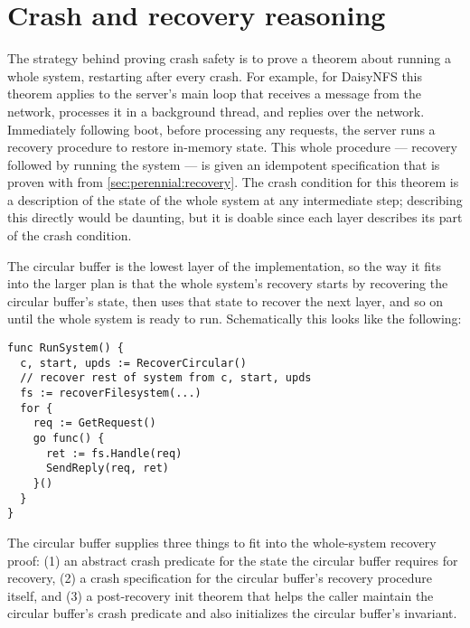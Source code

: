 \section{Crash and recovery reasoning}%
\label{sec:perennial:recovery-spec}

The strategy behind proving crash safety is to prove a theorem about running a
whole system, restarting after every crash. For example, for DaisyNFS this
theorem applies to the server's main loop that receives a message from the
network, processes it in a background thread, and replies over the network.
Immediately following boot, before processing any requests, the server runs a
recovery procedure to restore in-memory state. This whole procedure --- recovery
followed by running the system --- is given an idempotent specification that is
proven with  from \cref{sec:perennial:recovery}. The
crash condition for this theorem is a description of the state of the whole
system at any intermediate step; describing this directly would be daunting, but
it is doable since each layer describes its part of the crash condition.

The circular buffer is the lowest layer of the implementation, so the way it
fits into the larger plan is that the whole system's recovery starts by
recovering the circular buffer's state, then uses that state to recover the next
layer, and so on until the whole system is ready to run. Schematically this
looks like the following:
%
\begin{verbatim}
func RunSystem() {
  c, start, upds := RecoverCircular()
  // recover rest of system from c, start, upds
  fs := recoverFilesystem(...)
  for {
    req := GetRequest()
    go func() {
      ret := fs.Handle(req)
      SendReply(req, ret)
    }()
  }
}
\end{verbatim}

The circular buffer supplies three things to fit into the whole-system
recovery proof: (1) an abstract crash predicate for the state the circular
buffer requires for recovery, (2) a crash specification for the circular
buffer's recovery procedure itself, and (3) a post-recovery init theorem that
helps the caller maintain the circular buffer's crash predicate and also
initializes the circular buffer's invariant.


